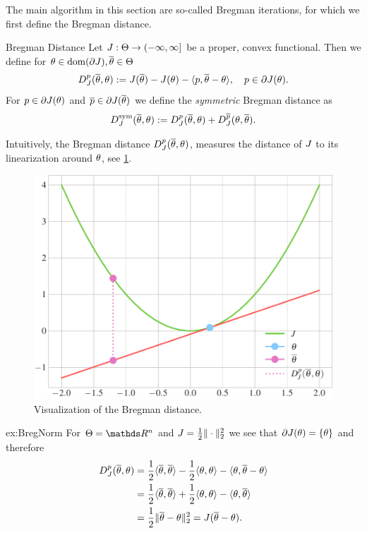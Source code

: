 The main algorithm in this section are so-called Bregman iterations, for which we first define the Bregman distance.
%
\begin{definition}{Bregman Distance}{}
Let $J:\Theta\to(-\infty,\infty]$ be a proper, convex functional. Then we define for $\theta\in\operatorname{dom}(\partial J),\overline{\theta}\in\Theta$
\begin{align}\label{eq:bregman_distance}
    D^p_J(\overline{\theta},\theta) := J(\overline {\theta})-J({\theta})-\langle p,\overline{\theta}-{\theta}\rangle,\quad p\in\partial J(\theta).
\end{align}
%
For $p\in\partial J({\theta})$ and $\overline{p}\in\partial J(\overline{\theta})$ we define the \emph{symmetric} Bregman distance as
\begin{align}
D^\mathrm{sym}_J(\overline{\theta},\theta) := D^p_J(\overline{\theta},\theta) + D^{\overline{p}}_J(\theta,\overline{\theta}).
\end{align}
\end{definition}
Intuitively, the Bregman distance $D^p_J(\overline{\theta},\theta)$, measures the distance of $J$ to its linearization around $\theta$, see \cref{fig:Bregdist}.
%
\begin{figure}
\centering
\includegraphics[width=.7\textwidth]{code/Bregman/lin_dist.pdf}
\caption{Visualization of the Bregman distance.}\label{fig:Bregdist}
\end{figure}
%
\begin{example}{}{ex:BregNorm}
For $\Param=\R^n$ and $J=\frac{1}{2}\|\cdot\|_2^2$ we see that $\partial J(\theta) = \{\theta\}$ and therefore
%
\begin{align*}
D_J^p(\overline{\theta}, \theta) &= 
\frac{1}{2}\langle \overline{\theta},\overline{\theta}\rangle - 
\frac{1}{2}\langle \theta,\theta\rangle - \langle \theta, \overline{\theta}-\theta\rangle 
\\&=
\frac{1}{2}\langle \overline{\theta},\overline{\theta}\rangle+
\frac{1}{2}\langle \theta,\theta\rangle -
\langle \theta,\overline{\theta}\rangle
\\&=
\frac{1}{2}\|\overline{\theta} - \theta\|_2^2 = J(\overline{\theta} - \theta).
\end{align*}
\end{example}
